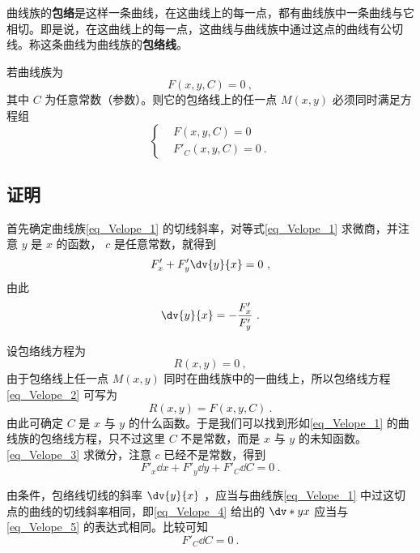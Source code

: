 曲线族的\textbf{包络}是这样一条曲线，在这曲线上的每一点，都有曲线族中一条曲线与它相切。即是说，在这曲线上的每一点，这曲线与曲线族中通过这点的曲线有公切线。称这条曲线为曲线族的\textbf{包络线}。

若曲线族为 
\begin{equation}\label{eq_Velope_1}
F(x,y,C)=0~,
\end{equation}
其中 $C$ 为任意常数（参数）。则它的包络线上的任一点 $M(x,y)$ 必须同时满足方程组
\begin{equation}\label{eq_Velope_6}
\left\{\begin{aligned}
&F(x,y,C)=0\\
&F'_C(x,y,C)=0~.
\end{aligned}\right.
\end{equation}
\subsection{证明}
首先确定曲线族\autoref{eq_Velope_1} 的切线斜率，对等式\autoref{eq_Velope_1} 求微商，并注意 $y$ 是 $x$ 的函数， $c$ 是任意常数，就得到
\begin{equation}
F'_x+F'_y\dv{y}{x}=0~,
\end{equation}
由此
\begin{equation}\label{eq_Velope_5}
\dv{y}{x}=-\frac{F'_x}{F'_y}~.
\end{equation}

设包络线方程为
\begin{equation}\label{eq_Velope_2}
R(x,y)=0~,
\end{equation}
由于包络线上任一点 $M(x,y)$ 同时在曲线族中的一曲线上，所以包络线方程\autoref{eq_Velope_2} 可写为
\begin{equation}\label{eq_Velope_3}
R(x,y)=F(x,y,C)~.
\end{equation}
由此可确定 $C$ 是 $x$ 与 $y$ 的什么函数。于是我们可以找到形如\autoref{eq_Velope_1} 的曲线族的包络线方程，只不过这里 $C$ 不是常数，而是 $x$ 与 $y$ 的未知函数。\autoref{eq_Velope_3} 求微分，注意 $c$ 已经不是常数，得到
\begin{equation}\label{eq_Velope_4}
F'_x\dd x+F'_y\dd y+F'_C\dd C=0~.
\end{equation}

由条件，包络线切线的斜率 $\dv{y}{x}$ ，应当与曲线族\autoref{eq_Velope_1} 中过这切点的曲线的切线斜率相同，即\autoref{eq_Velope_4} 给出的 $\dv*{y}{x}$ 应当与\autoref{eq_Velope_5} 的表达式相同。比较可知
\begin{equation}
F'_C\dd C=0~.
\end{equation}

